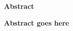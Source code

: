 \begin{center}
\huge{\textbf{Abstract}}
\end{center}

\begin{center}
\textbf{Abstract goes here}
\end{center}
